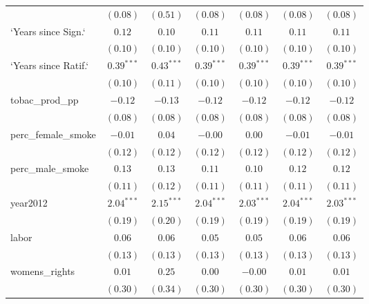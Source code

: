 \begin{table}[!h]
\begin{center}
\begin{tabular}{l c c c c c c }
                        & $(0.08)$     & $(0.51)$     & $(0.08)$     & $(0.08)$     & $(0.08)$     & $(0.08)$     \\
`Years since Sign.`     & $0.12$       & $0.10$       & $0.11$       & $0.11$       & $0.11$       & $0.11$       \\
                        & $(0.10)$     & $(0.10)$     & $(0.10)$     & $(0.10)$     & $(0.10)$     & $(0.10)$     \\
`Years since Ratif.`    & $0.39^{***}$ & $0.43^{***}$ & $0.39^{***}$ & $0.39^{***}$ & $0.39^{***}$ & $0.39^{***}$ \\
                        & $(0.10)$     & $(0.11)$     & $(0.10)$     & $(0.10)$     & $(0.10)$     & $(0.10)$     \\
tobac\_prod\_pp         & $-0.12$      & $-0.13$      & $-0.12$      & $-0.12$      & $-0.12$      & $-0.12$      \\
                        & $(0.08)$     & $(0.08)$     & $(0.08)$     & $(0.08)$     & $(0.08)$     & $(0.08)$     \\
perc\_female\_smoke     & $-0.01$      & $0.04$       & $-0.00$      & $0.00$       & $-0.01$      & $-0.01$      \\
                        & $(0.12)$     & $(0.12)$     & $(0.12)$     & $(0.12)$     & $(0.12)$     & $(0.12)$     \\
perc\_male\_smoke       & $0.13$       & $0.13$       & $0.11$       & $0.10$       & $0.12$       & $0.12$       \\
                        & $(0.11)$     & $(0.12)$     & $(0.11)$     & $(0.11)$     & $(0.11)$     & $(0.11)$     \\
year2012                & $2.04^{***}$ & $2.15^{***}$ & $2.04^{***}$ & $2.03^{***}$ & $2.04^{***}$ & $2.03^{***}$ \\
                        & $(0.19)$     & $(0.20)$     & $(0.19)$     & $(0.19)$     & $(0.19)$     & $(0.19)$     \\
labor                   & $0.06$       & $0.06$       & $0.05$       & $0.05$       & $0.06$       & $0.06$       \\
                        & $(0.13)$     & $(0.13)$     & $(0.13)$     & $(0.13)$     & $(0.13)$     & $(0.13)$     \\
womens\_rights          & $0.01$       & $0.25$       & $0.00$       & $-0.00$      & $0.01$       & $0.01$       \\
                        & $(0.30)$     & $(0.34)$     & $(0.30)$     & $(0.30)$     & $(0.30)$     & $(0.30)$     \\

\end{tabular}
\end{center}
\end{table}
